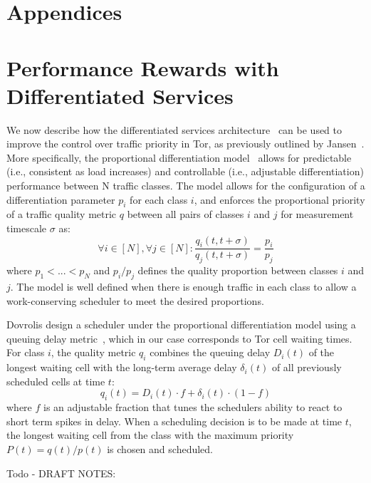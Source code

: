\appendix
\section*{Appendices}

\section{Performance Rewards with Differentiated Services}

We now describe how the differentiated services
architecture~\cite{blake1998architecture} can be used to improve the control
over traffic priority in Tor, as previously outlined by
Jansen~\cite{jansenphdthesis}. More specifically, the proportional
differentiation model~\cite{dovrolis1999case} allows for predictable (i.e.,
consistent as load increases) and controllable (i.e., adjustable differentiation) performance between N traffic
classes. The model allows for the configuration of a differentiation parameter
$p_i$ for each class $i$, and enforces the proportional priority of a traffic
quality metric $q$ between all pairs of classes $i$ and $j$ for measurement
timescale $\sigma$ as:
\begin{equation}
\forall i \in [N], \forall j \in [N]: \frac{q_i \left( t, t + \sigma \right)}{q_j \left( t, t + \sigma \right)} = \frac{p_i}{p_j}
\end{equation}
where $p_1 < ... < p_N$ and $p_i/p_j$ defines the quality proportion between
classes $i$ and $j$. The model is well defined when there is enough
traffic in each class to allow a work-conserving scheduler to meet the desired
proportions.

Dovrolis \etal design a scheduler under the proportional differentiation model
using a queuing delay metric~\cite{dovrolis2002proportional}, which in our case
corresponds to Tor cell waiting times. For class $i$, the quality metric $q_i$
combines the queuing delay $D_i(t)$ of the longest waiting cell with the
long-term average delay $\delta_i(t)$  of all previously scheduled cells at time $t$:
\begin{equation}
q_i(t) = D_i(t) \cdot f + \delta_i(t) \cdot (1-f)
\end{equation}
where $f$ is an adjustable fraction that tunes the schedulers ability to react
to short term spikes in delay. When a scheduling decision is to be made at time $t$,
the longest waiting cell from the class with the maximum priority
$P(t) = q(t)/p(t)$ is chosen and scheduled.


Todo - DRAFT NOTES:

